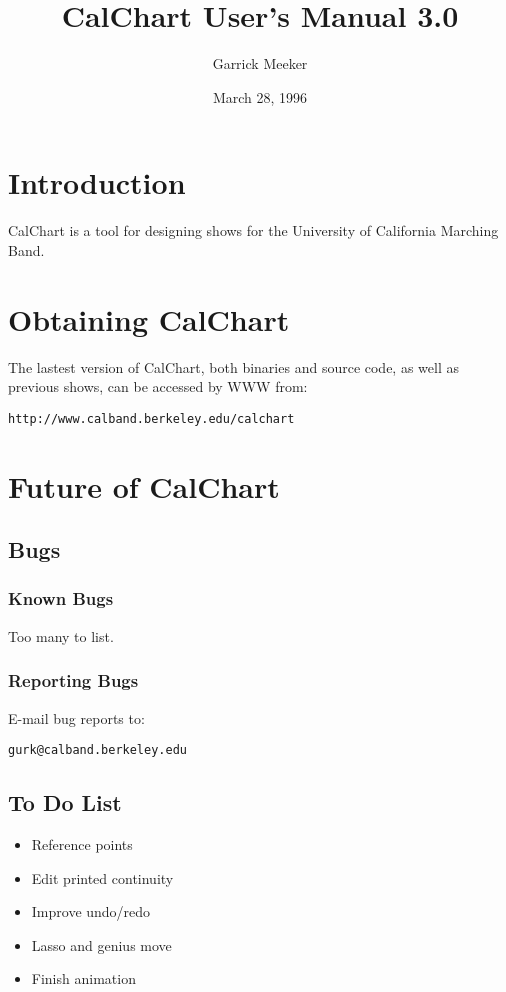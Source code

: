 \title{CalChart User's Manual 3.0}
\author{Garrick Meeker}
\date{March 28, 1996}
\makeindex

\maketitle
\tableofcontents

\chapter{Introduction}

CalChart is a tool for designing shows for the University of California
Marching Band.

\chapter{Obtaining CalChart}

The lastest version of CalChart, both binaries and source code, as well as
previous shows, can be accessed by WWW from:

\begin{verbatim}
http://www.calband.berkeley.edu/calchart
\end{verbatim}

\chapter{Future of CalChart}

\section{Bugs}
\subsection{Known Bugs}
Too many to list.

\subsection{Reporting Bugs}
E-mail bug reports to:

\begin{verbatim}
gurk@calband.berkeley.edu
\end{verbatim}

\section{To Do List}
\begin{itemize}\itemsep=0pt
\item Reference points
\item Edit printed continuity
\item Improve undo/redo
\item Lasso and genius move
\item Finish animation
\end{itemize}


